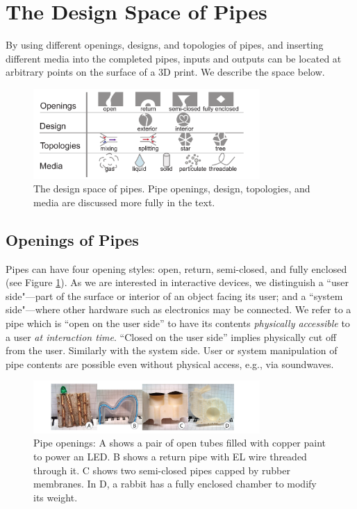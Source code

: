 \section{The Design Space of Pipes}
By using different openings, designs, and topologies of pipes, and inserting different media into the completed pipes, inputs and outputs can be located at arbitrary points on the surface of a 3D print.  We describe the space below.

\begin{figure}[h!]
\centering
    \includegraphics[width=3.4in]{figures/tubespace.pdf}
\caption{The design space of pipes.  Pipe openings, design, topologies, and media are discussed more fully in the text.}
\label{fig:pipespace}
\end{figure}

\subsection{Openings of Pipes}

Pipes can have four opening styles: open, return, semi-closed, and fully enclosed (see Figure \ref{fig:pipespace}).  As we are interested in interactive devices, we distinguish a ``user side"---part of the surface or interior of an object facing its user; and a ``system side"---where other hardware such as electronics may be connected.  We refer to a pipe which is ``open on the user side'' to have its contents \emph{physically accessible} to a user \emph{at interaction time}.  ``Closed on the user side'' implies physically cut off from the user.  Similarly with the system side.  User or system manipulation of pipe contents are possible even without physical access, e.g., via soundwaves. 

\begin{figure}[h]
\centering
    \includegraphics[width=3.4in]{figures/types.png}
\caption{Pipe openings: A shows a pair of open tubes filled with copper paint to power an LED.  B shows a return pipe with EL wire threaded through it.  C shows two semi-closed pipes capped by rubber membranes.  In D, a rabbit has a fully enclosed chamber to modify its weight. }
\label{fig:openings}
\end{figure}

